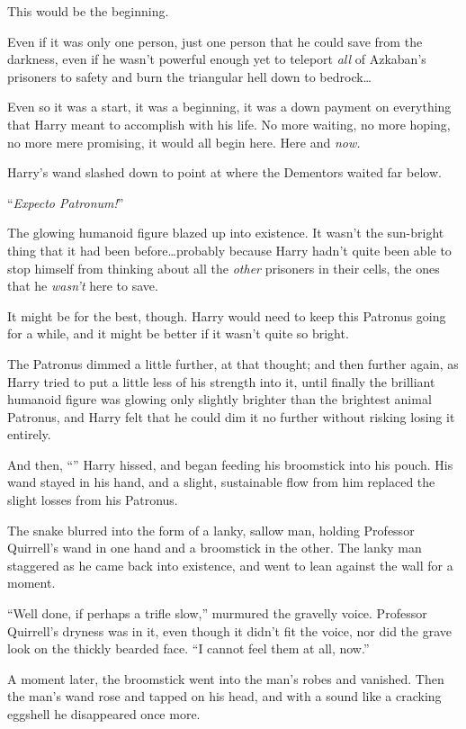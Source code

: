 This would be the beginning.

Even if it was only one person, just one person that he could save from the darkness, even if he wasn’t powerful enough yet to teleport \emph{all} of Azkaban’s prisoners to safety and burn the triangular hell down to bedrock…

Even so it was a start, it was a beginning, it was a down payment on everything that Harry meant to accomplish with his life. No more waiting, no more hoping, no more mere promising, it would all begin here. Here and \emph{now.}

Harry’s wand slashed down to point at where the Dementors waited far below.

“\emph{Expecto Patronum!}”

The glowing humanoid figure blazed up into existence. It wasn’t the sun-bright thing that it had been before…probably because Harry hadn’t quite been able to stop himself from thinking about all the \emph{other} prisoners in their cells, the ones that he \emph{wasn’t} here to save.

It might be for the best, though. Harry would need to keep this Patronus going for a while, and it might be better if it wasn’t quite so bright.

The Patronus dimmed a little further, at that thought; and then further again, as Harry tried to put a little less of his strength into it, until finally the brilliant humanoid figure was glowing only slightly brighter than the brightest animal Patronus, and Harry felt that he could dim it no further without risking losing it entirely.

And then, “” Harry hissed, and began feeding his broomstick into his pouch. His wand stayed in his hand, and a slight, sustainable flow from him replaced the slight losses from his Patronus.

The snake blurred into the form of a lanky, sallow man, holding Professor Quirrell’s wand in one hand and a broomstick in the other. The lanky man staggered as he came back into existence, and went to lean against the wall for a moment.

“Well done, if perhaps a trifle slow,” murmured the gravelly voice. Professor Quirrell’s dryness was in it, even though it didn’t fit the voice, nor did the grave look on the thickly bearded face. “I cannot feel them at all, now.”

A moment later, the broomstick went into the man’s robes and vanished. Then the man’s wand rose and tapped on his head, and with a sound like a cracking eggshell he disappeared once more.

